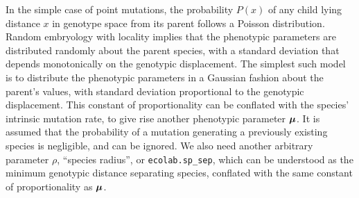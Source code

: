 In the simple case of point mutations, the probability $P(x)$ of any
child lying distance $x$ in genotype space from its parent follows a
Poisson distribution. Random embryology with locality implies that the
phenotypic parameters are distributed randomly about the parent
species, with a standard deviation that depends monotonically on the
genotypic displacement. The simplest such model is to distribute the
phenotypic parameters in a Gaussian fashion about the parent's values,
with standard deviation proportional to the genotypic displacement.
This constant of proportionality can be conflated with the species'
intrinsic mutation rate, to give rise another phenotypic parameter
$\mbox{\boldmath{$\mu$}}$.  It is assumed that the probability of a mutation generating a
previously existing species is negligible, and can be ignored. We also
need another arbitrary parameter $\rho$, ``species radius'', or
\verb+ecolab.sp_sep+, which can be understood as the
minimum genotypic distance separating species, conflated with the same
constant of proportionality as $\mbox{\boldmath{$\mu$}}$.

